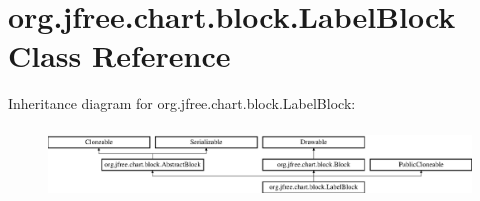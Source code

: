 \hypertarget{classorg_1_1jfree_1_1chart_1_1block_1_1_label_block}{}\section{org.\+jfree.\+chart.\+block.\+Label\+Block Class Reference}
\label{classorg_1_1jfree_1_1chart_1_1block_1_1_label_block}
Inheritance diagram for org.\+jfree.\+chart.\+block.\+Label\+Block\+:\begin{figure}[H]
\begin{center}
\leavevmode
\includegraphics[height=1.926605cm]{classorg_1_1jfree_1_1chart_1_1block_1_1_label_block}
\end{center}
\end{figure}
